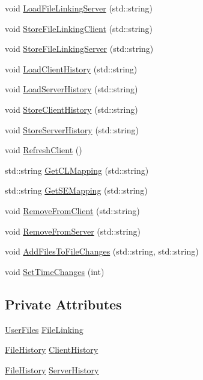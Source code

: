 \begin{DoxyCompactItemize}
\item 
void \hyperlink{classFileChanges_a8f7ed3f2a2e005f9829a0ffddb8cea8c}{Load\-File\-Linking\-Server} (std\-::string)
\item 
void \hyperlink{classFileChanges_a9e99307ed40ed50b3e231cf7fc207eaa}{Store\-File\-Linking\-Client} (std\-::string)
\item 
void \hyperlink{classFileChanges_aac76dc244929f4eb64af182f7c380f61}{Store\-File\-Linking\-Server} (std\-::string)
\item 
void \hyperlink{classFileChanges_a39ee3c6218c19379223e7e2898a07e34}{Load\-Client\-History} (std\-::string)
\item 
void \hyperlink{classFileChanges_a819ae66736374e1f24effddc1ff7fd31}{Load\-Server\-History} (std\-::string)
\item 
void \hyperlink{classFileChanges_a9fa5538e38213b369a14806b90dc2809}{Store\-Client\-History} (std\-::string)
\item 
void \hyperlink{classFileChanges_a8a42193670a052357c26092cc9f60be1}{Store\-Server\-History} (std\-::string)
\item 
void \hyperlink{classFileChanges_a5ef91c4d9d2c937eaaaa5556b46c0967}{Refresh\-Client} ()
\item 
std\-::string \hyperlink{classFileChanges_a6c28713232fc9c755d8558d0669770b4}{Get\-C\-L\-Mapping} (std\-::string)
\item 
std\-::string \hyperlink{classFileChanges_ad93cc4f246aa01d8ab90c3f20c08d10a}{Get\-S\-E\-Mapping} (std\-::string)
\item 
void \hyperlink{classFileChanges_af32088ffb23b9da0a5c6938815e740fe}{Remove\-From\-Client} (std\-::string)
\item 
void \hyperlink{classFileChanges_a478e9db08b5c0f9c818991caec3e30c4}{Remove\-From\-Server} (std\-::string)
\item 
void \hyperlink{classFileChanges_a90cf35d925069bda0e36460701073e11}{Add\-Files\-To\-File\-Changes} (std\-::string, std\-::string)
\item 
void \hyperlink{classFileChanges_a6abb9b166517768a6650204690d75325}{Set\-Time\-Changes} (int)
\end{DoxyCompactItemize}
\subsection*{Private Attributes}
\begin{DoxyCompactItemize}
\item 
\hyperlink{classUserFiles}{User\-Files} \hyperlink{classFileChanges_a8f30c47aa642cf91a6a2b8aa2a634517}{File\-Linking}
\item 
\hyperlink{classFileHistory}{File\-History} \hyperlink{classFileChanges_adffa34d6002296f12a49aa18dafddc51}{Client\-History}
\item 
\hyperlink{classFileHistory}{File\-History} \hyperlink{classFileChanges_a0023b1ff5ef7ad6670b522e52712ec03}{Server\-History}
\end{DoxyCompactItemize}


